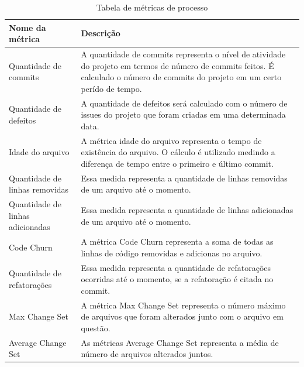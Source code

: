 \begin{table}[]
\centering
\caption{Tabela de métricas de processo}
\label{my-label}
\begin{tabular}{|p{3cm}|p{12cm}|}
\hline
Nome da métrica                  & Descrição                                                                                                                                                                         \\ \hline
Quantidade de commits            & A quantidade de commits representa o nível de atividade do projeto em termos de número de commits feitos. É calculado o número de commits do projeto em um certo perído de tempo. \\ \hline
Quantidade de defeitos           & A quantidade de defeitos será calculado com o número de issues do projeto que foram criadas em uma determinada data.                                                              \\ \hline
Idade do arquivo             & A métrica idade do arquivo representa o tempo de existência do arquivo. O cálculo é utilizado medindo a diferença de tempo entre o primeiro e último commit.                  \\ \hline
Quantidade de linhas removidas   & Essa medida representa a quantidade de linhas removidas de um arquivo até o momento.                                                                                              \\ \hline
Quantidade de linhas adicionadas & Essa medida representa a quantidade de linhas adicionadas de um arquivo até o momento.                                                                                            \\ \hline
Code Churn                       & A métrica Code Churn representa a soma de todas as linhas de código removidas e adicionas no arquivo.                                                                             \\ \hline
Quantidade de refatorações       & Essa medida representa a quantidade de refatorações ocorridas até o momento, se a refatoração é citada no commit.                                                                 \\ \hline
Max Change Set                   & A métrica Max Change Set representa o número máximo de arquivos que foram alterados junto com o arquivo em questão.                                                               \\ \hline
Average Change Set               & As métricas Average Change Set representa a média de número de arquivos alterados juntos.                                                                                         \\ \hline
\end{tabular}
\end{table}
